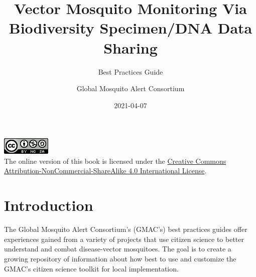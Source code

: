 \documentclass[
]{article}
\title{Vector Mosquito Monitoring Via Biodiversity Specimen/DNA Data Sharing}
\subtitle{Best Practices Guide}
\author{Global Mosquito Alert Consortium}
\date{2021-04-07}
\begin{document}
\maketitle

{
\setcounter{tocdepth}{2}
\tableofcontents
}
\hypertarget{section}{%
\section*{}\label{section}}

\includegraphics{images/by-nc-sa.png}\\
The online version of this book is licensed under the \href{http://creativecommons.org/licenses/by-nc-sa/4.0/}{Creative Commons Attribution-NonCommercial-ShareAlike 4.0 International License}.

\hypertarget{intro}{%
\section{Introduction}\label{intro}}

The Global Mosquito Alert Consortium's (GMAC's) best practices guides offer experiences gained from a variety of projects that use citizen science to better understand and combat disease-vector mosquitoes. The goal is to create a growing repository of information about how best to use and customize the GMAC's citizen science toolkit for local implementation.
\end{document}
